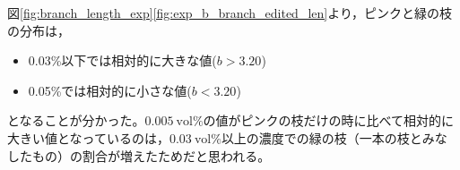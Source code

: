 \documentclass[autodetect-engine,dvi=dvipdfmx,a4paper,ja=standard,oneside,openany,11pt,draft]{bxjsbook}
\begin{document}
図\ref{fig:branch_length_exp}\ref{fig:exp_b_branch_edited_len}より，ピンクと緑の枝の分布は，
\begin{itemize}
  \item 0.03\%以下では相対的に大きな値($b>3.20$)
  \item 0.05\%では相対的に小さな値($b<3.20$)
\end{itemize}
となることが分かった。$\SI{0.005}{\mathrm{vol}\%}$の値がピンクの枝だけの時に比べて相対的に大きい値となっているのは，$\SI{0.03}{\mathrm{vol}\%}$以上の濃度での緑の枝（一本の枝とみなしたもの）の割合が増えたためだと思われる。
\ifdraft{
  
  
}{}
\end{document}
